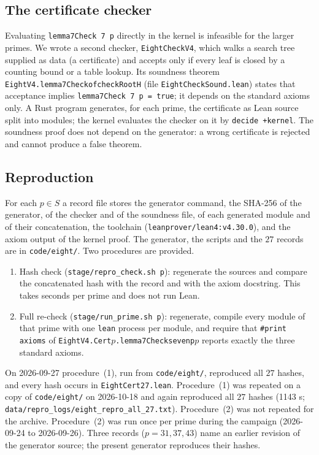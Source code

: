 \documentclass[11pt]{amsart}
\theoremstyle{plain}
\theoremstyle{definition}
\theoremstyle{remark}
\newcommand{\lean}[1]{{\def\_{\textunderscore\allowbreak}\def\.{.\allowbreak}\texttt{#1}}}
\begin{document}
\subsection{The certificate checker}
Evaluating \lean{lemma7Check 7 p} directly in the kernel is infeasible for the larger primes. We
wrote a second checker, \lean{EightCheckV4}, which walks a search tree supplied as data (a
certificate) and accepts only if every leaf is closed by a counting bound or a table lookup. Its
soundness theorem \lean{EightV4.lemma7Check\_of\_checkRootH} (file \lean{EightCheckSound.lean})
states that acceptance implies \lean{lemma7Check 7 p = true}; it depends on the standard axioms
only. A Rust program generates, for each prime, the certificate as Lean source split into modules;
the kernel evaluates the checker on it by \lean{decide +kernel}. The soundness proof does not depend
on the generator: a wrong certificate is rejected and cannot produce a false theorem.

\subsection{Reproduction}\label{sec:repro}
For each $p\in S$ a record file stores the generator command, the SHA-256 of the generator, of the
checker and of the soundness file, of each generated module and of their concatenation, the
toolchain (\lean{leanprover/lean4:v4.30.0}), and the axiom output of the kernel proof. The generator,
the scripts and the $27$ records are in \texttt{code/eight/}. Two procedures are provided.
\begin{enumerate}
\item Hash check (\texttt{stage/repro\_check.sh p}): regenerate the sources and compare the
concatenated hash with the record and with the axiom docstring. This takes seconds per prime and
does not run Lean.
\item Full re-check (\texttt{stage/run\_prime.sh p}): regenerate, compile every module of that
prime with one \lean{lean} process per module, and require that \lean{\#print axioms} of
\lean{EightV4.Cert}$p$\lean{.lemma7Check\_seven\_p}$p$ reports exactly the three standard axioms.
\end{enumerate}
On 2026-09-27 procedure~(1), run from \texttt{code/eight/}, reproduced all $27$ hashes, and every
hash occurs in \lean{EightCert27.lean}. Procedure~(1) was repeated on a copy of \texttt{code/eight/} on 2026-10-18 and again reproduced all $27$ hashes (1143 s; \texttt{data/repro\_logs/eight\_repro\_all\_27.txt}). Procedure~(2) was not repeated for the archive. Procedure~(2) was run once per prime during the campaign
(2026-09-24 to 2026-09-26). Three records (\(p=31,37,43\)) name an earlier revision of the generator
source; the present generator reproduces their hashes.
\end{document}

